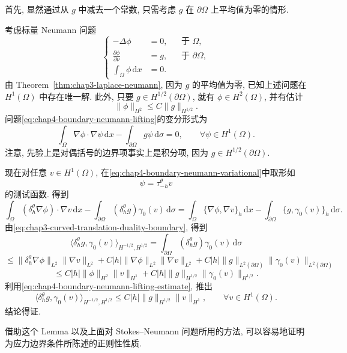 \begin{Proof}
首先, 显然通过从 $g$ 中减去一个常数, 只需考虑 $g$ 在 $\partial\Omega$ 上平均值为零的情形.

考虑标量 Neumann 问题
\begin{equation}
 \left\{
 \begin{aligned}
  -\Delta\phi&=0,&&\text{于 }\Omega,\\
  \frac{\partial\phi}{\partial\nu}&=g,&&\text{于 }\partial\Omega,\\
  \int_\Omega\phi\,\mathrm dx&=0.
 \end{aligned}
 \right.
 \label{eq:chap4-boundary-neumann-lifting}
\end{equation}
由 Theorem~\ref{thm:chap3-laplace-neumann}, 因为 $g$ 的平均值为零, 已知上述问题在 $H^1(\Omega)$ 中存在唯一解. 此外, 只要 $g\in H^{1/2}(\partial\Omega)$, 就有 $\phi\in H^2(\Omega)$, 并有估计
\begin{equation}
 \|\phi\|_{H^2}\leq C\|g\|_{H^{1/2}}.
 \label{eq:chap4-boundary-neumann-lifting-estimate}
\end{equation}
问题\eqref{eq:chap4-boundary-neumann-lifting}的变分形式为
\begin{equation}
 \int_\Omega\nabla\phi\cdot\nabla\psi\,\mathrm dx
 -\int_{\partial\Omega}g\psi\,\mathrm d\sigma=0,
 \qquad\forall\psi\in H^1(\Omega).
 \label{eq:chap4-boundary-neumann-variational}
\end{equation}
注意, 先验上是对偶括号的边界项事实上是积分项, 因为 $g\in H^{1/2}(\partial\Omega)$.

现在对任意 $v\in H^1(\Omega)$, 在\eqref{eq:chap4-boundary-neumann-variational}中取形如
\[
 \psi=\tau_{-h}^\theta v
\]
的测试函数. 得到
\[
 \int_\Omega(\delta_h^\theta\nabla\phi)\cdot\nabla v\,\mathrm dx
 -\int_{\partial\Omega}(\delta_h^\theta g)\gamma_0(v)\,\mathrm d\sigma
 =\int_\Omega\{\nabla\phi,\nabla v\}_h\,\mathrm dx
 -\int_{\partial\Omega}\{g,\gamma_0(v)\}_h\,\mathrm d\sigma.
\]
由\eqref{eq:chap3-curved-translation-duality-boundary}, 得到
\[
 \langle\delta_h^\theta g,\gamma_0(v)\rangle_{H^{-1/2},H^{1/2}}
 =\int_{\partial\Omega}(\delta_h^\theta g)\gamma_0(v)\,\mathrm d\sigma
\]
\[
 \leq\|\delta_h^\theta\nabla\phi\|_{L^2}\|\nabla v\|_{L^2}
 +C|h|\|\nabla\phi\|_{L^2}\|\nabla v\|_{L^2}
 +C|h|\|g\|_{L^2(\partial\Omega)}\|\gamma_0(v)\|_{L^2(\partial\Omega)}
\]
\[
 \leq C|h|\|\phi\|_{H^2}\|v\|_{H^1}
 +C|h|\|g\|_{H^{1/2}}\|\gamma_0(v)\|_{H^{1/2}}.
\]
利用\eqref{eq:chap4-boundary-neumann-lifting-estimate}, 推出
\[
 \langle\delta_h^\theta g,\gamma_0(v)\rangle_{H^{-1/2},H^{1/2}}
 \leq C|h|\|g\|_{H^{1/2}}\|v\|_{H^1},
 \qquad\forall v\in H^1(\Omega).
\]
结论得证.
\end{Proof}

借助这个 Lemma 以及上面对 Stokes--Neumann 问题所用的方法, 可以容易地证明为应力边界条件所陈述的正则性性质.
